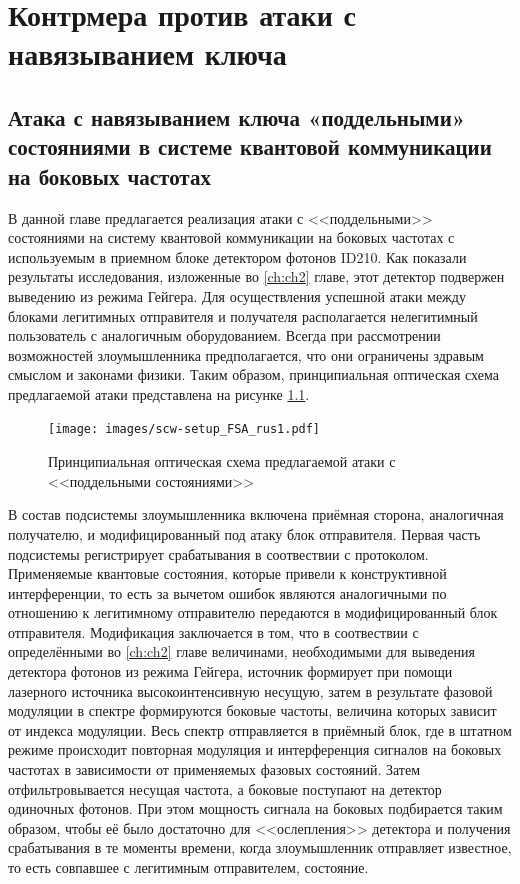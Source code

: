 \chapter{Контрмера против атаки с навязыванием ключа} \label{ch:ch3}


\section{Атака с навязыванием ключа «поддельными» состояниями в системе квантовой коммуникации на боковых частотах} \label{sec:ch3/sec1}

В данной главе предлагается реализация атаки с <<поддельными>> состояниями на систему квантовой коммуникации на боковых частотах с используемым в приемном блоке детектором фотонов ID210. Как показали результаты исследования, изложенные во \ref{ch:ch2} главе, этот детектор подвержен выведению из режима Гейгера. Для осуществления успешной атаки между блоками легитимных отправителя и получателя располагается нелегитимный пользователь с аналогичным оборудованием. Всегда при рассмотрении возможностей злоумышленника предполагается, что они ограничены здравым смыслом и законами физики. Таким образом, принципиальная оптическая схема предлагаемой атаки представлена на рисунке \ref{fig:SCW_FSA}. 

 \begin{figure}[ht]
  \centering
  \texttt{[image: images/scw-setup\_FSA\_rus1.pdf]}
  \caption{Принципиальная оптическая схема предлагаемой атаки с <<поддельными состояниями>>}
  \label{fig:SCW_FSA}
\end{figure}

В состав подсистемы злоумышленника включена приёмная сторона, аналогичная получателю, и модифицированный под атаку блок отправителя. Первая часть подсистемы регистрирует срабатывания в соотвествии с протоколом. Применяемые квантовые состояния, которые привели к конструктивной интерференции, то есть за вычетом ошибок являются аналогичными по отношению к легитимному отправителю передаются в модифицированный блок отправителя. Модификация заключается в том, что в соотвествии с определёнными во \ref{ch:ch2} главе величинами, необходимыми для выведения детектора фотонов из режима Гейгера, источник формирует при помощи лазерного источника высокоинтенсивную несущую, затем в результате фазовой модуляции в спектре формируются боковые частоты, величина которых зависит от индекса модуляции. Весь спектр отправляется в приёмный блок, где в штатном режиме происходит повторная модуляция и интерференция сигналов на боковых частотах в зависимости от применяемых фазовых состояний. Затем отфильтровывается несущая частота, а боковые поступают на детектор одиночных фотонов. При этом мощность сигнала на боковых подбирается таким образом, чтобы её было достаточно для <<ослепления>> детектора и получения срабатывания в те моменты времени, когда злоумышленник отправляет известное, то есть совпавшее с легитимным отправителем, состояние. 


